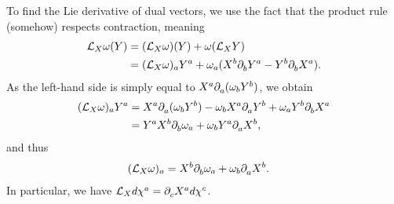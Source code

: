 To find the Lie derivative of dual vectors, we use the fact that the product rule (somehow) respects contraction, meaning
\begin{align*}
	\mathcal{L}_{X}\omega(Y) &= (\mathcal{L}_{X}\omega)(Y) + \omega(\mathcal{L}_{X}Y) \\
&= (\mathcal{L}_{X}\omega)_{a}Y^{a} + \omega_{a}(X^{b}\partial^{}_{b}Y^{a} - Y^{b}\partial^{}_{b}X^{a}).
\end{align*}
As the left-hand side is simply equal to $X^{a}\partial^{}_{a}(\omega_{b}Y^{b})$, we obtain
\begin{align*}
	(\mathcal{L}_{X}\omega)_{a}Y^{a} &= X^{a}\partial^{}_{a}(\omega_{b}Y^{b}) - \omega_{b}X^{a}\partial^{}_{a}Y^{b} + \omega_{a}Y^{b}\partial^{}_{b}X^{a} \\
&= Y^{a}X^{b}\partial^{}_{b}\omega_{a} + \omega_{b}Y^{a}\partial^{}_{a}X^{b},
\end{align*}
and thus
\begin{align*}
	(\mathcal{L}_{X}\omega)_{a} &= X^{b}\partial^{}_{b}\omega_{a} + \omega_{b}\partial^{}_{a}X^{b}.
\end{align*}
In particular, we have $\mathcal{L}_{X}d\chi^{a} = \partial^{}_{c}X^{a}d\chi^{c}$.

